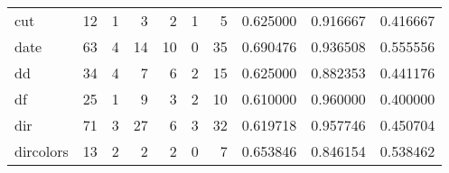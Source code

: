 \begin{tabular}{lrrrrrrrrr}
cut       &                                      12 &                                                  1 &                                                  3 &                                                  2 &                                                  1 &                                                  5 &                                           0.625000 &                               0.916667 &                             0.416667 \\
date      &                                      63 &                                                  4 &                                                 14 &                                                 10 &                                                  0 &                                                 35 &                                           0.690476 &                               0.936508 &                             0.555556 \\
dd        &                                      34 &                                                  4 &                                                  7 &                                                  6 &                                                  2 &                                                 15 &                                           0.625000 &                               0.882353 &                             0.441176 \\
df        &                                      25 &                                                  1 &                                                  9 &                                                  3 &                                                  2 &                                                 10 &                                           0.610000 &                               0.960000 &                             0.400000 \\
dir       &                                      71 &                                                  3 &                                                 27 &                                                  6 &                                                  3 &                                                 32 &                                           0.619718 &                               0.957746 &                             0.450704 \\
dircolors &                                      13 &                                                  2 &                                                  2 &                                                  2 &                                                  0 &                                                  7 &                                           0.653846 &                               0.846154 &                             0.538462 \\

\end{tabular}
